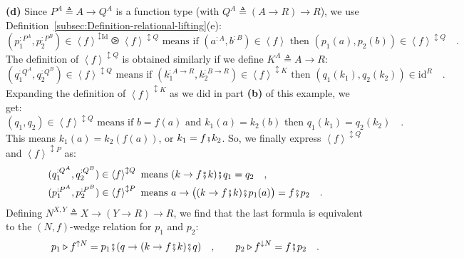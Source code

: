 \textbf{(d)} Since $P^{A}\triangleq A\rightarrow Q^{A}$ is a function
type (with $Q^{A}\triangleq\left(A\rightarrow R\right)\rightarrow R$),
we use Definition~\ref{subsec:Definition-relational-lifting}(e):
\[
(p_{1}^{:P^{A}},p_{2}^{:P^{B}})\in\left<f\right>^{\updownarrow\text{Id}}\ogreaterthan\left<f\right>^{\updownarrow Q}\text{ means if }(a^{:A},b^{:B})\in\left<f\right>\text{ then }(p_{1}(a),p_{2}(b))\in\left<f\right>^{\updownarrow Q}\quad.
\]
The definition of $\left<f\right>^{\updownarrow Q}$ is obtained similarly
if we define $K^{A}\triangleq A\rightarrow R$:
\[
(q_{1}^{:Q^{A}},q_{2}^{:Q^{B}})\in\left<f\right>^{\updownarrow Q}\text{ means if }(k_{1}^{:A\rightarrow R},k_{2}^{:B\rightarrow R})\in\left<f\right>^{\updownarrow K}\text{ then }(q_{1}(k_{1}),q_{2}(k_{2}))\in\text{id}^{R}\quad.
\]
Expanding the definition of $\left<f\right>^{\updownarrow K}$ as
we did in part \textbf{(b)} of this example, we get:
\[
(q_{1},q_{2})\in\left<f\right>^{\updownarrow Q}\text{ means if }b=f(a)\text{ and }k_{1}(a)=k_{2}(b)\text{ then }q_{1}(k_{1})=q_{2}(k_{2})\quad.
\]
This means $k_{1}(a)=k_{2}(f(a))$, or $k_{1}=f\bef k_{2}$. So, we
finally express $\left<f\right>^{\updownarrow Q}$ and $\left<f\right>^{\updownarrow P}$
as:
\begin{align*}
 & (q_{1}^{:Q^{A}},q_{2}^{:Q^{B}})\in\left<f\right>^{\updownarrow Q}\text{ means }(k\rightarrow f\bef k)\bef q_{1}=q_{2}\quad,\\
 & (p_{1}^{:P^{A}},p_{2}^{:P^{B}})\in\left<f\right>^{\updownarrow P}\text{ means }a\rightarrow\big((k\rightarrow f\bef k)\bef p_{1}(a)\big)=f\bef p_{2}\quad.
\end{align*}
Defining $N^{X,Y}\triangleq X\rightarrow\left(Y\rightarrow R\right)\rightarrow R$,
we find that the last formula is equivalent to the $\left(N,f\right)$-wedge
relation for $p_{1}$ and $p_{2}$:
\[
p_{1}\triangleright f^{\uparrow N}=p_{1}\bef(q\rightarrow(k\rightarrow f\bef k)\bef q)\quad,\quad\quad p_{2}\triangleright f^{\downarrow N}=f\bef p_{2}\quad.
\]
 

